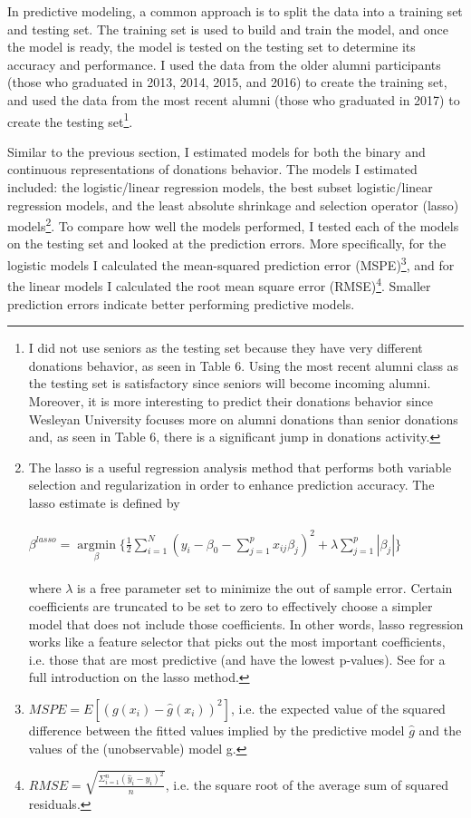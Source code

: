 \documentclass[12pt]{article}
\begin{document}
In predictive modeling, a common approach is to split the data into a training set and testing set. The training set is used to build and train the model, and once the model is ready, the model is tested on the testing set to determine its accuracy and performance. I used the data from the older alumni participants (those who graduated in 2013, 2014, 2015, and 2016) to create the training set, and used the data from the most recent alumni (those who graduated in 2017) to create the testing set\footnote{I did not use seniors as the testing set because they have very different donations behavior, as seen in Table 6. Using the most recent alumni class as the testing set is satisfactory since seniors will become incoming alumni. Moreover, it is more interesting to predict their donations behavior since Wesleyan University focuses more on alumni donations than senior donations and, as seen in Table 6, there is a significant jump in donations activity.}. 

Similar to the previous section, I estimated models for both the binary and continuous representations of donations behavior. The models I estimated included: the logistic/linear regression models, the best subset logistic/linear regression models, and the least absolute shrinkage and selection operator (lasso) models\footnote{The lasso is a useful regression analysis method that performs both variable selection and regularization in order to enhance prediction accuracy. The lasso estimate is defined by\\ \\
\( \beta^{lasso}=\mathop\mathrm{argmin}\limits_{\beta} \{ \frac{1}{2} \sum_{i=1}^{N} (y_{i} - \beta_{0} - \sum_{j=1}^{p}x_{ij}\beta _{j})^{2}+\lambda\sum_{j=1}^{p}|\beta _{j}|\} \) \\ \\
where \(\lambda\) is a free parameter set to minimize the out of sample error. Certain coefficients are truncated to be set to zero to effectively choose a simpler model that does not include those coefficients. In other words, lasso regression works like a feature selector that picks out the most important coefficients, i.e. those that are most predictive (and have the lowest p-values). See \cite{tibshirani_1996} for a full introduction on the lasso method.}. To compare how well the models performed, I tested each of the models on the testing set and looked at the prediction errors. More specifically, for the logistic models I calculated the mean-squared prediction error (MSPE)\footnote{\(MSPE = E[(g(x_{i}) - \hat{g}(x_{i}))^{2}]\), i.e. the expected value of the squared difference between the fitted values implied by the predictive model \(\hat{g}\) and the values of the (unobservable) model g.}, and for the linear models I calculated the root mean square error (RMSE)\footnote{\(RMSE = \sqrt{\frac{\Sigma_{i=1}^{n}{(\hat{y}_{i} - y_{i})^2}}{n}}\), i.e. the square root of the average sum of squared residuals.}. Smaller prediction errors indicate better performing predictive models.
\end{document}
